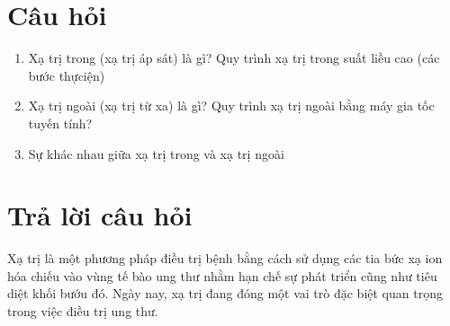 \section{Câu hỏi}
    \begin{enumerate}
        \item Xạ trị trong (xạ trị áp sát) là gì? Quy trình xạ trị trong suất liều cao (các bước thựciện)
        \item Xạ trị ngoài (xạ trị từ xa) là gì? Quy trình xạ trị ngoài bằng máy gia tốc tuyến tính?
        \item Sự khác nhau giữa xạ trị trong và xạ trị ngoài
    \end{enumerate}
\section{Trả lời câu hỏi}
Xạ trị là một phương pháp điều trị bệnh bằng cách sử dụng các tia bức xạ ion hóa chiếu vào vùng tế bào ung thư nhằm hạn chế sự phát triển cũng như tiêu diệt khối bướu đó. Ngày nay, xạ trị đang đóng một vai trò đặc biệt quan trọng trong việc điều trị ung thư.
